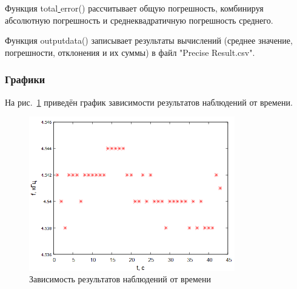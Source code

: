 Функция total\underline{ }error() рассчитывает общую погрешность, комбинируя абсолютную погрешность и среднеквадратичную погрешность среднего.

Функция outputdata() записывает результаты вычислений (среднее значение, погрешности, отклонения и их суммы) в файл "Precise Result.csv".


\subsubsection{Графики}

На рис.~\ref{fig:graph1} приведён график зависимости результатов наблюдений от времени.
\begin{figure}[H]
\centering
\includegraphics[width=0.8\textwidth]{graph1}
\caption{Зависимость результатов наблюдений от времени}
\label{fig:graph1}
\end{figure}

